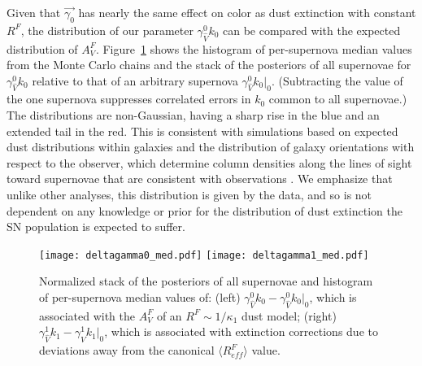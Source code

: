 \documentclass{aastex61}   	%
\begin{document}
Given that
$\vec{\gamma_0}$  has nearly the same effect on color as dust extinction with constant $R^F$,
the distribution of
our parameter $\gamma^0_{\hat{V}} k_0$ can be compared with the expected distribution
of $A^F_V$.
Figure~\ref{k0_med:fig} shows the histogram of
\color{red}
per-supernova
\color{black}
median values
from the Monte Carlo chains
and the  \color{red} stack of the posteriors of all supernovae \color{black}  for $\gamma^0_{\hat{V}} k_0$ 
relative to that of an arbitrary supernova  $\gamma^0_{\hat{V}} k_0|_0$.
(Subtracting the value of the one supernova suppresses correlated errors in $k_0$ common to all supernovae.)
The distributions are non-Gaussian, having a sharp rise in the blue and an extended tail in the red.  This is consistent
with
simulations based on expected dust distributions
within galaxies and the distribution of galaxy orientations with respect to the observer,
which determine column densities along the lines of sight toward supernovae that are consistent with observations
\citep{1998ApJ...502..177H, 2007ApJ...659..122J}.  
We emphasize that unlike other analyses,
this distribution is given by the data, and so is not dependent on any knowledge or prior
for the distribution of dust extinction the SN population is expected to suffer. 


\begin{figure}[htbp] %
   \centering
   \texttt{[image: deltagamma0\_med.pdf]}
   \texttt{[image: deltagamma1\_med.pdf]}
      \caption{
      Normalized  \color{red} stack of the posteriors of all supernovae \color{black}  and histogram 
      of \color{red} per-supernova \color{black}
median values of: (left) $\gamma^0_{\hat{V}} k_0-\gamma^0_{\hat{V}} k_0|_0$, which is associated with the $A^F_V$ of an $R^F \sim 1/\kappa_1$ dust model;
(right) $\gamma^1_{\hat{V}} k_1-\gamma^1_{\hat{V}} k_1|_0$,
which  is associated with extinction corrections due to deviations away from the canonical $\langle R^F_{\mathit{eff}}\rangle$ value.
   \label{k0_med:fig}}
\end{figure}
\end{document}
